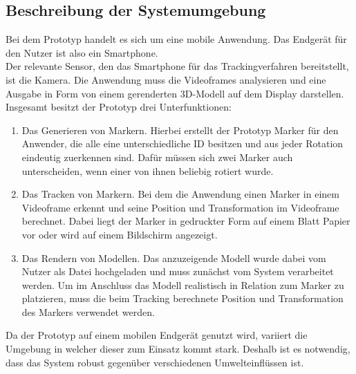 \subsection{Beschreibung der Systemumgebung}
Bei dem Prototyp handelt es sich um eine mobile Anwendung. Das Endgerät für den Nutzer ist also ein Smartphone. \\
Der relevante Sensor, den das Smartphone für das Trackingverfahren bereitstellt, ist die Kamera. Die Anwendung muss die Videoframes analysieren und eine Ausgabe in Form von einem gerenderten 3D-Modell auf dem Display darstellen. \\

Insgesamt besitzt der Prototyp drei Unterfunktionen: \\
\begin{enumerate}
\item Das Generieren von Markern. Hierbei erstellt der Prototyp Marker für den Anwender, die alle eine unterschiedliche ID besitzen und aus jeder Rotation eindeutig zuerkennen sind. Dafür müssen sich zwei Marker auch unterscheiden, wenn einer von ihnen beliebig rotiert wurde.
\item Das Tracken von Markern. Bei dem die Anwendung einen Marker in einem Videoframe erkennt und seine Position und Transformation im Videoframe berechnet. Dabei liegt der Marker in gedruckter Form auf einem Blatt Papier vor oder wird auf einem Bildschirm angezeigt.
\item Das Rendern von Modellen. Das anzuzeigende Modell wurde dabei vom Nutzer  als Datei hochgeladen und muss zunächst vom System verarbeitet werden. Um im Anschluss das Modell realistisch in Relation zum Marker zu platzieren, muss die beim Tracking berechnete Position und Transformation des Markers verwendet werden. 
\end{enumerate}
Da der Prototyp auf einem mobilen Endgerät genutzt wird, variiert die Umgebung in welcher dieser zum Einsatz kommt stark. Deshalb ist es notwendig, dass das System robust gegenüber verschiedenen Umwelteinflüssen ist.\\


